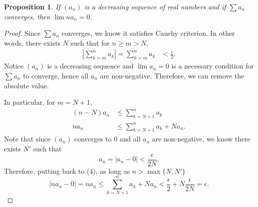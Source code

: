 \documentclass{article}
\newtheorem{proposition}[thm]{Proposition}
\begin{document}
\begin{proposition}
    If $(a_n)$ is a decreasing sequence of real numbers and if $\sum a_n$ converges, then 
    $\lim na_n=0$.
\end{proposition}
\begin{proof}
    Since $\sum a_n$ converges, we know it satisfies Cauchy criterion. In other words, there exists 
    $N$ such that for $n\ge m>N$, 
    \begin{align*}
        \left|\sum_{k=m}^{n}a_k\right| = \sum_{k=m}^{n}a_k & < \frac{\epsilon}{2}.
    \end{align*}
    Notice $(a_n)$ is a decreasing sequence and $\lim a_n=0$ is a necessary condition for $\sum a_n$ 
    to converge, hence all $a_n$ are non-negative. Therefore, we can remove the absolute value.
    
    In particular, for $m=N+1$,
    \begin{align}
        (n-N)a_n & \le \sum_{k=N+1}^{n}a_k \nonumber \\
        na_n & \le \sum_{k=N+1}^{n}a_k + Na_n.
    \end{align}
    Note that since $(a_n)$ converges to 0 and all $a_n$ are non-negative, we know there exists 
    $N'$ such that
    $$a_n  = |a_n-0| < \frac{\epsilon}{2N}.$$
    Therefore, putting back to (4), as long as $n > \max\{N,N'\}$
    $$|na_n - 0| = na_n \le \sum_{k=N+1}^{n}a_k + Na_n < 
    \frac{\epsilon}{2} + N\frac{\epsilon}{2N} = \epsilon.$$
\end{proof}

\newpage
\end{document}
